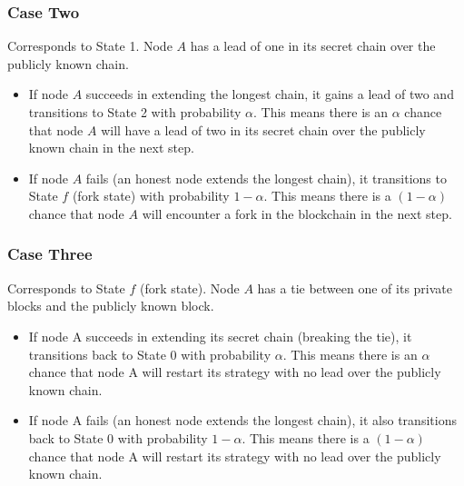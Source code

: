 
\subsubsection{Case Two}
Corresponds to State 1. Node $A$ has a lead of one in its secret chain over the publicly known chain.
\begin{itemize}
    \item If node $A$ succeeds in extending the longest chain, it gains a lead of two and transitions to State 2 with probability $\alpha$. This means there is an $\alpha$ chance that node $A$ will have a lead of two in its secret chain over the publicly known chain in the next step.
    \item If node $A$ fails (an honest node extends the longest chain), it transitions to State $f$ (fork state) with probability $1 - \alpha$. This means there is a $(1 - \alpha)$ chance that node $A$ will encounter a fork in the blockchain in the next step.
\end{itemize}


\subsubsection{Case Three}
Corresponds to State $f$ (fork state). Node $A$ has a tie between one of its private blocks and the publicly known block.
\begin{itemize}
    \item If node A succeeds in extending its secret chain (breaking the tie), it transitions back to State 0 with probability $\alpha$. This means there is an $\alpha$ chance that node A will restart its strategy with no lead over the publicly known chain.
    \item If node A fails (an honest node extends the longest chain), it also transitions back to State 0 with probability $1 - \alpha$. This means there is a $(1 - \alpha)$ chance that node A will restart its strategy with no lead over the publicly known chain.
\end{itemize}

